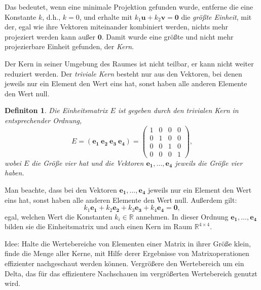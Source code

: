 \documentclass{scrartcl}
\newtheorem{definition}{Definiton}[section]
\numberwithin{equation}{section}
\begin{document}
Das bedeutet, wenn eine minimale Projektion gefunden wurde, entferne die eine Konstante $k$, d.h., $k = 0$, und erhalte mit $k_1 \boldsymbol{u} + k_2\boldsymbol{v} = \boldsymbol{0}$ die \textit{größte Einheit}, mit der, egal wie ihre Vektoren miteinander kombiniert werden, nichts mehr projeziert werden kann außer $\boldsymbol{0}$. Damit wurde eine größte und nicht mehr projezierbare Einheit gefunden, der \textit{Kern}.

Der Kern in seiner Umgebung des Raumes ist nicht teilbar, er kann nicht weiter reduziert werden. Der \textit{triviale Kern} besteht nur aus den Vektoren, bei denen jeweils nur ein Element den Wert eins hat, sonst haben alle anderen Elemente den Wert null.
\begin{definition}
	Die Einheitsmatrix $E$ ist gegeben durch den trivialen Kern in entsprechender Ordnung, $$ E = (\boldsymbol{e_1} \: \boldsymbol{e_2} \: \boldsymbol{e_3} \: \boldsymbol{e_4}) = 
	\begin{pmatrix}
		1 & 0 & 0 & 0 \\
		0 & 1 & 0 & 0 \\
		0 & 0 & 1 & 0 \\
		0 & 0 & 0 & 1
	\end{pmatrix},$$
wobei $E$ die Größe vier hat und die Vektoren $\boldsymbol{e_1}, \ldots, \boldsymbol{e_4}$  jeweils die Größe vier haben.
\end{definition}
Man beachte, dass bei den Vektoren $\boldsymbol{e_1}, \ldots, \boldsymbol{e_4}$ jeweils nur ein Element den Wert eins hat, sonst haben alle anderen Elemente den Wert null. Außerdem gilt:
$$ k_1\boldsymbol{e_1} + k_2\boldsymbol{e_2} + k_3\boldsymbol{e_3} + k_4\boldsymbol{e_4} = \boldsymbol{0},$$ egal, welchen Wert die Konstanten $k_i \in \mathbb{R} $ annehmen. In dieser Ordnung $\boldsymbol{e_1}, \ldots, \boldsymbol{e_4}$ bilden sie die Einheitsmatrix und auch einen Kern im Raum $\mathbb{R}^{4 \times 4}$. 
 
Idee: Halte die Wertebereiche von Elementen einer Matrix in ihrer Größe klein, finde die Menge aller Kerne, mit Hilfe derer Ergebnisse von Matrixoperationen effizienter nachgeschaut werden können. Vergrößere den Wertebereich um ein Delta, das für das effizientere Nachschauen im vergrößerten Wertebereich genutzt wird.
\end{document}
